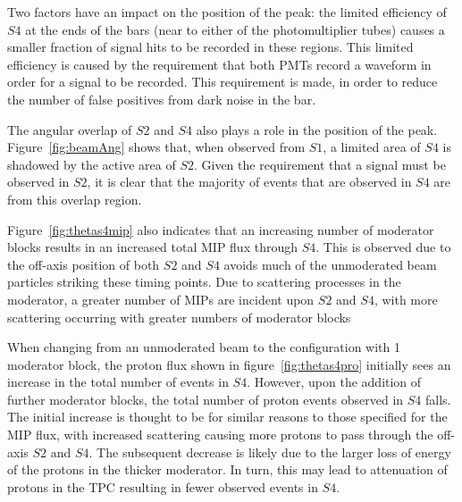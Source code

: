 	Two factors have an impact on the position of the peak:
	the limited efficiency of $S4$ at the ends of the bars (near to either of the photomultiplier tubes) causes a smaller fraction of signal hits to be recorded in these regions. 
	This limited efficiency is caused by the requirement that both PMTs record a waveform in order for a signal to be recorded.
	This requirement is made, in order to reduce the number of false positives from dark noise in the bar.
	
	The angular overlap of $S2$ and $S4$ also plays a role in the position of the peak. 
	Figure~\ref{fig:beamAng} shows that, when observed from $S1$, a limited area of $S4$ is shadowed by the active area of $S2$.
	Given the requirement that a signal must be observed in $S2$, it is clear that the majority of events that are observed in $S4$ are from this overlap region.
   
   	Figure~\ref{fig:thetas4mip} also indicates that an increasing number of moderator blocks results in an increased total MIP flux through $S4$.
   	This is observed due to the off-axis position of both $S2$ and $S4$ avoids much of the unmoderated beam particles striking these timing points.
   	Due to scattering processes in the moderator, a greater number of MIPs are incident upon $S2$ and $S4$, with more scattering occurring with greater numbers of moderator blocks
   	
   	When changing from an unmoderated beam to the configuration with 1 moderator block, the proton flux shown in figure~\ref{fig:thetas4pro} initially sees an increase in the total number of events in $S4$.
   	However, upon the addition of further moderator blocks, the total number of proton events observed in $S4$ falls.
   	The initial increase is thought to be for similar reasons to those specified for the MIP flux, with increased scattering causing more protons to pass through the off-axis $S2$ and $S4$.
   	The subsequent decrease is likely due to the larger loss of energy of the protons in the thicker moderator.
   	In turn, this may lead to attenuation of protons in the TPC resulting in fewer observed events in $S4$.
   
